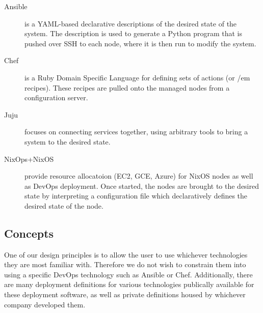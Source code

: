 \documentclass[9pt,twocolumn,twoside]{styles/osajnl}
\begin{document}
\begin{description}

\item[Ansible] is a YAML-based declarative descriptions of the desired
  state of the system. The description is used to generate a Python
  program that is pushed over SSH to each node, where it is then run
  to modify the system.

\item[Chef] is a Ruby Domain Specific Language for defining sets of
  actions (or {/em recipes}). These recipes are pulled onto the
  managed nodes from a configuration server.

\item[Juju] focuses on connecting services together, using arbitrary
  tools to bring a system to the desired state.

\item[NixOps+NixOS] provide resource allocatoion (EC2, GCE, Azure) for
  NixOS nodes as well as DevOps deployment. Once started, the nodes
  are brought to the desired state by interpreting a configuration
  file which declaratively defines the desired state of the node.

\end{description}


\subsection{Concepts}

One of our design principles is to allow the user to use whichever
technologies they are most familiar with. Therefore we do not wish to
constrain them into using a specific DevOps technology such as Ansible
or Chef. Additionally, there are many deployment definitions for
various technologies publically available for these deployment
software, as well as private definitions housed by whichever company
developed them.
\end{document}
